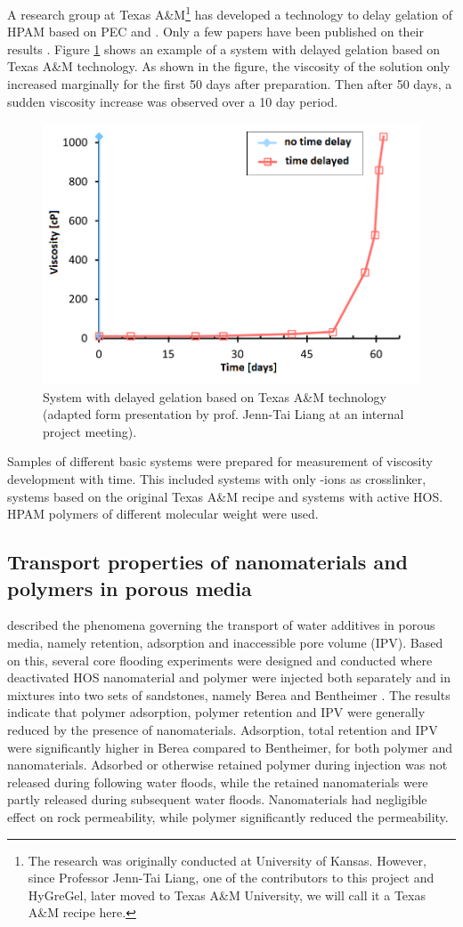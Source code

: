 \documentclass[nanomaterials,article,submit,moreauthors,pdftex]{Definitions/mdpi}
\begin{document}
A research group at Texas A\&M\footnote{The research was originally conducted at University of Kansas. However, since Professor Jenn-Tai Liang, one of the contributors to this project and HyGreGel, later moved to Texas A\&M University, we will call it a Texas A\&M recipe here.} has developed a technology to delay gelation of HPAM based on PEC and . Only a few papers have been published on their results \citep{Cordova2008,Johnson2010}. Figure \ref{cht:jennTai} shows an example of a system with delayed gelation based on Texas A\&M technology. As shown in the figure, the viscosity of the solution only increased marginally for the first 50 days after preparation. Then after 50 days, a sudden viscosity increase was observed over a 10 day period.

\begin{figure}[h!]
    \centering
    \includegraphics[width=.5\textwidth]{fig/jennTai.png}
    \caption{System with delayed gelation based on Texas A\&M technology \citep{Cordova2008} (adapted form presentation by prof. Jenn-Tai Liang at an internal project meeting).}
    \label{cht:jennTai}
\end{figure}
    
Samples of different basic systems were prepared for measurement of viscosity development with time. This included systems with only -ions as crosslinker, systems based on the original Texas A\&M recipe \citep{Cordova2008} and systems with active HOS. HPAM polymers of different molecular weight were used.
    
\subsection{Transport properties of nanomaterials and polymers in porous media}
\citet{Lotsch1985} described the phenomena governing the transport of water additives in porous media, namely retention, adsorption and inaccessible pore volume (IPV). Based on this, several core flooding experiments were designed and conducted where deactivated HOS nanomaterial and polymer were injected both separately and in mixtures into two sets of sandstones, namely Berea and Bentheimer \citep{Najafiazar2016}. The results indicate that polymer adsorption, polymer retention and IPV were generally reduced by the presence of nanomaterials. Adsorption, total retention and IPV were significantly higher in Berea compared to Bentheimer, for both polymer and nanomaterials. Adsorbed or otherwise retained polymer during injection was not released during following water floods, while the retained nanomaterials were partly released during subsequent water floods. Nanomaterials had negligible effect on rock permeability, while polymer significantly reduced the permeability.
\end{document}
